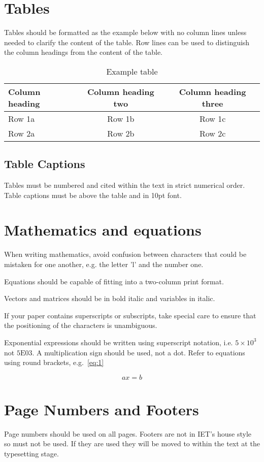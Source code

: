 \documentclass{ietperso}
\begin{document}
\begin{ietbody}
\section{Tables}
Tables should be formatted as the example below with no column lines unless needed to clarify the content of the table. Row lines can be used to distinguish the column headings from the content of the table.

\begin{table}
\caption{\label{tab:table1}Example table}
\begin{tabular}{lcc}
\hline
Column heading & Column heading two & Column heading three \\
\hline
Row 1a & Row 1b & Row 1c \\
Row 2a & Row 2b & Row 2c \\
\hline
\end{tabular}
\end{table}

\subsection{Table Captions}
Tables must be numbered and cited within the text in strict numerical order. Table captions must be above the table and in 10pt font.

\section{Mathematics and equations}
When writing mathematics, avoid confusion between characters that could be mistaken for one another, e.g. the letter 'l' and the number one.

Equations should be capable of fitting into a two-column print format.

Vectors and matrices should be in bold italic and variables in italic.

If your paper contains superscripts or subscripts, take special care to ensure that the positioning of the characters is unambiguous.

Exponential expressions should be written using superscript notation, i.e. $5\times 10^3$ not $5\text{E}03$. A multiplication sign should be used, not a dot.
Refer to equations using round brackets, e.g.~\eqref{eq:1}

\begin{equation}\label{eq:1}
ax = b
\end{equation}

\section{Page Numbers and Footers}
Page numbers should be used on all pages. Footers are not in IET’s house style so must not be used. If they are used they will be moved to within the text at the typesetting stage.


\end{ietbody}
\end{document}
